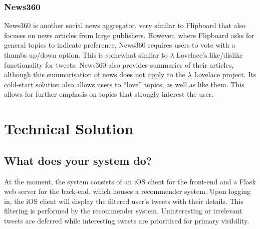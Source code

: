 \documentclass{article}
\begin{document}
\subsubsection*{News360}
News360 is another social news aggregator, very similar to Flipboard that also focuses on news articles from large publishers. However, where Flipboard asks for general topics to indicate preference,  News360 requires users to vote with a thumbs up/down option. This is somewhat similar to $\lambda$ Lovelace's like/dislike functionality for tweets. News360 also provides summaries of their articles, although this summarisation of news does not apply to the $\lambda$ Lovelace project. Its cold-start solution also allows users to “love” topics, as well as like them. This allows for further emphasis on topics that strongly interest the user.

\section{Technical Solution}
%
%
%
\subsection{What does your system do?}

% 
At the moment, the system consists of an iOS client for the front-end and a Flask\cite{flask} web server for the back-end, which houses a recommender system. Upon logging in, the iOS client will display the filtered user's tweets with their details. This filtering is performed by the recommender system. Uninteresting or irrelevant tweets are deferred while interesting tweets are prioritised for primary visibility. 
\end{document}
